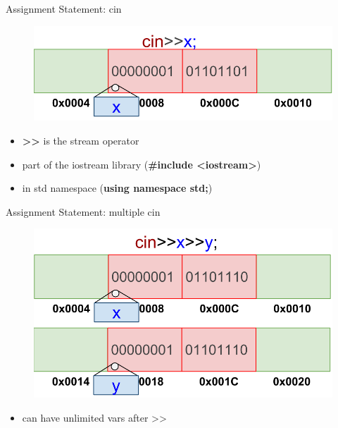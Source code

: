 \documentclass[xcolor={dvipsnames}]{beamer}
\begin{document}
\begin{frame}{Assignment Statement: cin}
\begin{figure}
	\includegraphics[width=1\textwidth]{cin}
\end{figure}

\begin{block}{}
	\begin{itemize}
		\item \textbf{\textgreater\textgreater}  is the stream operator
		\item part of the iostream library (\textbf{\#include \textless iostream\textgreater})
		\item in std namespace (\textbf{using namespace std;})
	\end{itemize}
\end{block}
\end{frame}

\begin{frame}{Assignment Statement: multiple cin}
\begin{figure}
	\includegraphics[width=1\textwidth]{mcin}
\end{figure}

\begin{block}{}
	\begin{itemize}
		\item can have unlimited vars after \textgreater\textgreater
	\end{itemize}
\end{block}
\end{frame}
\end{document}
